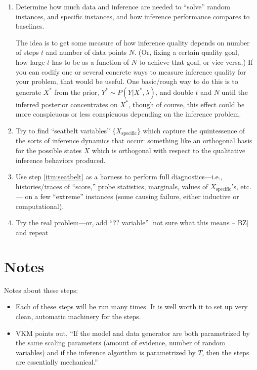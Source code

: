 \documentclass[11pt]{article}
\newcommand{\Xsp}{X_{\text{specific}}}
\begin{document}
\begin{enumerate}
  \item Determine how much data and inference are needed to ``solve'' random
    instances, and specific instances, and how inference performance compares to
    baselines.

    The idea is to get some measure of how inference quality depends on number
    of steps $t$ and number of data points $N$.  (Or, fixing a certain quality
    goal, how large $t$ has to be as a function of $N$ to achieve that goal, or
    vice versa.)  If you can codify one or several concrete ways to measure
    inference quality for your problem, that would be useful.  One basic/rough
    way to do this is to generate $X^*$ from the prior, $Y^* \sim
    P(Y|X^*,\lambda)$, and double $t$ and $N$ until the inferred posterior
    concentrates on $X^*$, though of course, this effect could be more
    conspicuous or less conspicuous depending on the inference problem.

  \item\label{itm:seatbelt}
    Try to find ``seatbelt variables'' $\{\Xsp\}$ which capture the quintessence
    of the sorts of inference dynamics that occur: something like an orthogonal
    basis for the possible states $X$ which is orthogonal with respect to the
    qualitative inference behaviors produced.

  \item Use step \ref{itm:seatbelt} as a harness to perform full
    diagnostics---i.e., histories/traces of ``score,'' probe statistics,
    marginals, values of $\Xsp$'s, etc.--- on a few ``extreme'' instances (some
    causing failure, either inductive or computational).

  \item Try the real problem---or, add ``?? variable'' [not sure what this means
    -- BZ] and repeat
\end{enumerate}

\section{Notes}

Notes about these steps:
\begin{itemize}
  \item Each of these steps will be run many times.  It is well worth it to set
    up very clean, automatic machinery for the steps.
  \item VKM points out, ``If the model and data generator are both parametrized
    by the same scaling parameters (amount of evidence, number of random
    variables) and if the inference algorithm is parametrized by $T$, then the
    steps are essentially mechanical.''
\end{itemize}
\end{document}
